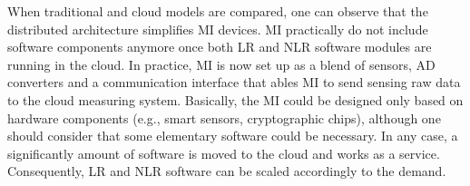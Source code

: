 \documentclass[journal]{IEEEtran}
\begin{document}
When traditional and cloud models are compared, one can observe that the distributed architecture simplifies MI devices. MI practically do not include software components anymore once both LR and NLR software modules are running in the cloud. In practice, MI is now set up as a blend of sensors, AD converters and a communication interface that ables MI to send sensing raw data to the cloud measuring system. Basically, the MI could be designed only based on hardware components (e.g., smart sensors, cryptographic chips), although one should consider that some elementary software could be necessary. In any case, a significantly amount of software is moved to the cloud and works as a service. Consequently, LR and NLR software can be scaled accordingly to the demand.

\end{document}
